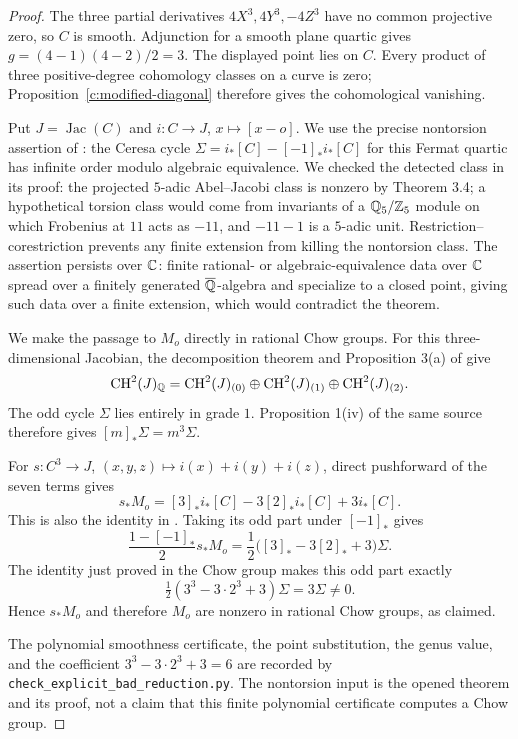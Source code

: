 \begin{proof}
The three partial derivatives $4X^3,4Y^3,-4Z^3$ have no common projective zero, so $C$ is smooth. Adjunction for a smooth plane quartic gives $g=(4-1)(4-2)/2=3$. The displayed point lies on $C$. Every product of three positive-degree cohomology classes on a curve is zero; Proposition~\ref{c:modified-diagonal} therefore gives the cohomological vanishing.

Put $J=\operatorname{Jac}(C)$ and $i:C\to J$, $x\mapsto[x-o]$. We use the precise nontorsion assertion of \citet[Theorem 4.1, printed p.~104]{c_bloch1984}: the Ceresa cycle $\Sigma=i_*[C]-[-1]_*i_*[C]$ for this Fermat quartic has infinite order modulo algebraic equivalence. We checked the detected class in its proof: the projected $5$-adic Abel--Jacobi class is nonzero by Theorem 3.4; a hypothetical torsion class would come from invariants of a $\mathbb Q_5/\mathbb Z_5$ module on which Frobenius at $11$ acts as $-11$, and $-11-1$ is a $5$-adic unit. Restriction--corestriction prevents any finite extension from killing the nontorsion class. The assertion persists over $\mathbb C$: finite rational- or algebraic-equivalence data over $\mathbb C$ spread over a finitely generated $\overline{\mathbb Q}$-algebra and specialize to a closed point, giving such data over a finite extension, which would contradict the theorem.

We make the passage to $M_o$ directly in rational Chow groups. For this three-dimensional Jacobian, the decomposition theorem and Proposition 3(a) of \citet[pp.~647--649]{c_beauville1986} give
\[
 \operatorname{CH}^2(J)_\mathbb Q=\operatorname{CH}^2(J)_{(0)}\oplus\operatorname{CH}^2(J)_{(1)}\oplus\operatorname{CH}^2(J)_{(2)}.
\]
The odd cycle $\Sigma$ lies entirely in grade $1$. Proposition 1(iv) of the same source therefore gives $[m]_*\Sigma=m^3\Sigma$.

For $s:C^3\to J$, $(x,y,z)\mapsto i(x)+i(y)+i(z)$, direct pushforward of the seven terms gives
\[
 s_*M_o=[3]_*i_*[C]-3[2]_*i_*[C]+3i_*[C].
\]
This is also the identity in \citet[Proposition 5.3]{c_grossschoen1995}. Taking its odd part under $[-1]_*$ gives
\[
 \frac{1-[-1]_*}{2}s_*M_o
 =\frac12\bigl([3]_* -3[2]_*+3\bigr)\Sigma.
\]
The identity just proved in the Chow group makes this odd part exactly
\[
 \tfrac12(3^3-3\cdot2^3+3)\Sigma=3\Sigma\ne0.
\]
Hence $s_*M_o$ and therefore $M_o$ are nonzero in rational Chow groups, as claimed.

The polynomial smoothness certificate, the point substitution, the genus value, and the coefficient $3^3-3\cdot2^3+3=6$ are recorded by \texttt{check\_explicit\_bad\_reduction.py}. The nontorsion input is the opened theorem and its proof, not a claim that this finite polynomial certificate computes a Chow group.
\end{proof}

